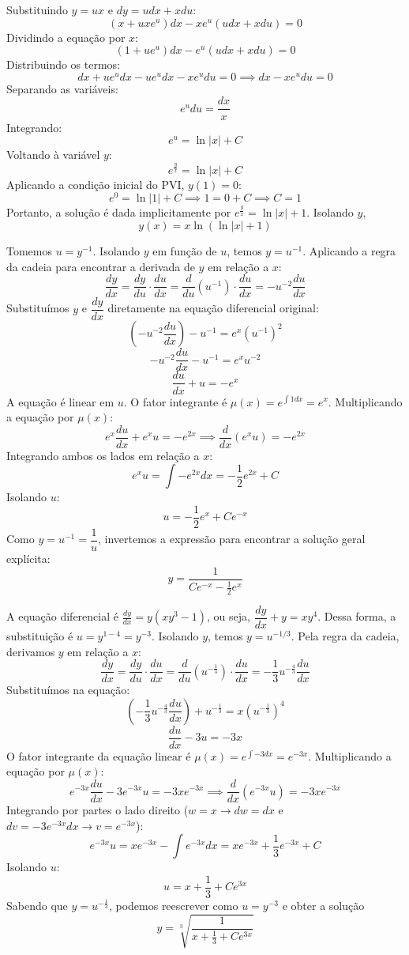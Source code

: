 \documentclass[oneside,12pt,a4paper]{report}
\begin{document}
\begin{resolucao}
        \itemresolucao Substituindo $y=ux$ e $dy=udx+xdu$:
        \[(x+uxe^u)dx-xe^u(udx+xdu)=0\]
        Dividindo a equação por $x$:
        \[(1+ue^u)dx-e^u(udx+xdu)=0\]
        Distribuindo os termos:
        \[dx+ue^udx-ue^udx-xe^udu=0 \implies dx-xe^udu=0\]
        Separando as variáveis:
        \[e^udu=\frac{dx}{x}\]
        Integrando:
        \[e^u=\ln|x|+C\]
        Voltando à variável $y$:
        \[e^{\frac{y}{x}}=\ln|x|+C\]
        Aplicando a condição inicial do PVI, $y(1)=0$:
        \[e^{0}=\ln|1|+C \implies 1=0+C \implies C=1\]
        Portanto, a solução é dada implicitamente por $e^{\frac{y}{x}}=\ln|x|+1$. Isolando $y$,
        \[\boxed{y(x)=x\ln(\ln|x|+1)}\]
    \end{resolucao}

    \begin{resolucao}
        \itemresolucao Tomemos $u=y^{-1}$. Isolando $y$ em função de $u$, temos $y=u^{-1}$.
        Aplicando a regra da cadeia para encontrar a derivada de $y$ em relação a $x$:
        \[\frac{dy}{dx}=\frac{dy}{du}\cdot\frac{du}{dx} = \frac{d}{du}(u^{-1})\cdot\frac{du}{dx} = -u^{-2}\frac{du}{dx}\]
        Substituímos $y$ e $\dfrac{dy}{dx}$ diretamente na equação diferencial original:
        \[\left(-u^{-2}\frac{du}{dx}\right) - u^{-1} = e^x(u^{-1})^2\]
        \[-u^{-2}\frac{du}{dx} - u^{-1} = e^xu^{-2}\]
        \[\frac{du}{dx}+u=-e^x\]
        A equação é linear em $u$. O fator integrante é $\mu(x)=e^{\int 1 dx}=e^x$. Multiplicando a equação por $\mu(x)$:
        \[e^x\frac{du}{dx}+e^xu=-e^{2x} \implies \frac{d}{dx}(e^xu)=-e^{2x}\]
        Integrando ambos os lados em relação a $x$:
        \[e^xu = \int -e^{2x}dx = -\frac{1}{2}e^{2x}+C\]
        Isolando $u$:
        \[u = -\frac{1}{2}e^x+Ce^{-x}\]
        Como $y=u^{-1}=\dfrac{1}{u}$, invertemos a expressão para encontrar a solução geral explícita:
        \[\boxed{y=\frac{1}{Ce^{-x}-\frac{1}{2}e^x}}\]

        \itemresolucao A equação diferencial é $\frac{dy}{dx}=y(xy^3-1)$, ou seja, $\dfrac{dy}{dx}+y=xy^4$. Dessa forma, a substituição é $u=y^{1-4}=y^{-3}$. Isolando $y$, temos $y=u^{-1/3}$.
        Pela regra da cadeia, derivamos $y$ em relação a $x$:
        \[\frac{dy}{dx}=\frac{dy}{du}\cdot\frac{du}{dx} = \frac{d}{du}(u^{-\frac{1}{3}})\cdot\frac{du}{dx} = -\frac{1}{3}u^{-\frac{4}{3}}\frac{du}{dx}\]
        Substituímos na equação:
        \[\left(-\frac{1}{3}u^{-\frac{4}{3}}\frac{du}{dx}\right) + u^{-\frac{1}{3}} = x(u^{-\frac{1}{3}})^4\]
        \[\frac{du}{dx}-3u=-3x\]
        O fator integrante da equação linear é $\mu(x)=e^{\int -3 dx}=e^{-3x}$. Multiplicando a equação por $\mu(x)$:
        \[e^{-3x}\frac{du}{dx}-3e^{-3x}u=-3xe^{-3x} \implies \frac{d}{dx}(e^{-3x}u)=-3xe^{-3x}\]
        Integrando por partes o lado direito ($w=x \rightarrow dw=dx$ e $dv=-3e^{-3x}dx \rightarrow v=e^{-3x}$):
        \[e^{-3x}u = xe^{-3x} - \int e^{-3x}dx = xe^{-3x}+\frac{1}{3}e^{-3x}+C\]
        Isolando $u$:
        \[u = x+\frac{1}{3}+Ce^{3x}\]
        Sabendo que $y=u^{-\frac{1}{3}}$, podemos reescrever como $u=y^{-3}$ e obter a solução
        \[\boxed{y=\sqrt[3]{\frac{1}{x+\frac{1}{3}+Ce^{3x}}}}\]


\end{resolucao}
\end{document}
